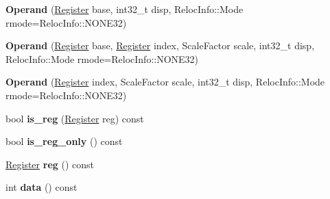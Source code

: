 \begin{DoxyCompactItemize}
\item 
{\bfseries Operand} (\hyperlink{structv8_1_1internal_1_1_register}{Register} base, int32\+\_\+t disp, Reloc\+Info\+::\+Mode rmode=Reloc\+Info\+::\+N\+O\+N\+E32)\hypertarget{classv8_1_1internal_1_1_b_a_s_e___e_m_b_e_d_d_e_d_aaf9395ae2496a44af9a1096003822f07}{}\label{classv8_1_1internal_1_1_b_a_s_e___e_m_b_e_d_d_e_d_aaf9395ae2496a44af9a1096003822f07}

\item 
{\bfseries Operand} (\hyperlink{structv8_1_1internal_1_1_register}{Register} base, \hyperlink{structv8_1_1internal_1_1_register}{Register} index, Scale\+Factor scale, int32\+\_\+t disp, Reloc\+Info\+::\+Mode rmode=Reloc\+Info\+::\+N\+O\+N\+E32)\hypertarget{classv8_1_1internal_1_1_b_a_s_e___e_m_b_e_d_d_e_d_abdb7100ee6180a2b42a79487c48074bc}{}\label{classv8_1_1internal_1_1_b_a_s_e___e_m_b_e_d_d_e_d_abdb7100ee6180a2b42a79487c48074bc}

\item 
{\bfseries Operand} (\hyperlink{structv8_1_1internal_1_1_register}{Register} index, Scale\+Factor scale, int32\+\_\+t disp, Reloc\+Info\+::\+Mode rmode=Reloc\+Info\+::\+N\+O\+N\+E32)\hypertarget{classv8_1_1internal_1_1_b_a_s_e___e_m_b_e_d_d_e_d_a7ccd277bf30133bf507d6159ab10f858}{}\label{classv8_1_1internal_1_1_b_a_s_e___e_m_b_e_d_d_e_d_a7ccd277bf30133bf507d6159ab10f858}

\item 
bool {\bfseries is\+\_\+reg} (\hyperlink{structv8_1_1internal_1_1_register}{Register} reg) const \hypertarget{classv8_1_1internal_1_1_b_a_s_e___e_m_b_e_d_d_e_d_ad0cb4421740c6506eac95a4b308328e5}{}\label{classv8_1_1internal_1_1_b_a_s_e___e_m_b_e_d_d_e_d_ad0cb4421740c6506eac95a4b308328e5}

\item 
bool {\bfseries is\+\_\+reg\+\_\+only} () const \hypertarget{classv8_1_1internal_1_1_b_a_s_e___e_m_b_e_d_d_e_d_a9f7e4ed27cf960586ffc25d19d679fb1}{}\label{classv8_1_1internal_1_1_b_a_s_e___e_m_b_e_d_d_e_d_a9f7e4ed27cf960586ffc25d19d679fb1}

\item 
\hyperlink{structv8_1_1internal_1_1_register}{Register} {\bfseries reg} () const \hypertarget{classv8_1_1internal_1_1_b_a_s_e___e_m_b_e_d_d_e_d_af39795f113894c295306762723817d84}{}\label{classv8_1_1internal_1_1_b_a_s_e___e_m_b_e_d_d_e_d_af39795f113894c295306762723817d84}

\item 
int {\bfseries data} () const \hypertarget{classv8_1_1internal_1_1_b_a_s_e___e_m_b_e_d_d_e_d_aaef0bad816fcc3dbd0716f48110785e0}{}\label{classv8_1_1internal_1_1_b_a_s_e___e_m_b_e_d_d_e_d_aaef0bad816fcc3dbd0716f48110785e0}


\end{DoxyCompactItemize}
